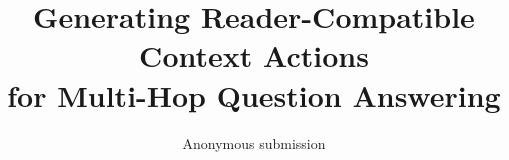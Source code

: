 \documentclass[10pt,twocolumn]{article}
\title{Generating Reader-Compatible Context Actions\\
for Multi-Hop Question Answering}
\author{Anonymous submission}
\date{}
\begin{document}
\maketitle

\begin{abstract}

\end{abstract}






\clearpage
\appendix

\end{document}
